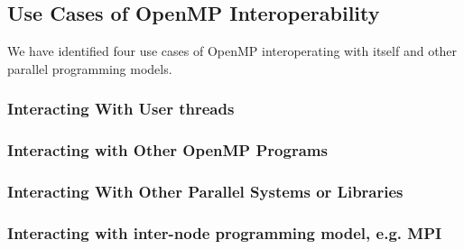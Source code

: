 
\subsection{Use Cases of OpenMP Interoperability}
We have identified four use cases of OpenMP interoperating with itself and other parallel programming models. 
\subsubsection{Interacting With User threads}


\subsubsection{Interacting with Other OpenMP Programs}


\subsubsection{Interacting With Other Parallel Systems or Libraries}


\subsubsection{Interacting with inter-node programming model, e.g. MPI}




